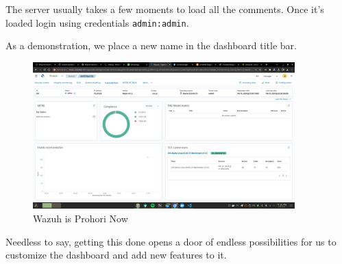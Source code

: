 The server usually takes a few moments to load all the comments. Once it's loaded login using credentials \texttt{admin:admin}.

As a demonstration, we place a new name in the dashboard title bar.
    \begin{figure} [H]
        \centering
        \includegraphics[width=0.9\textwidth]{images/prohori.jpg}
        \caption{Wazuh is Prohori Now}
        \label{fig:prohori}
    \end{figure}
Needless to say, getting this done opens a door of endless possibilities for us to customize the dashboard and add new features to it.